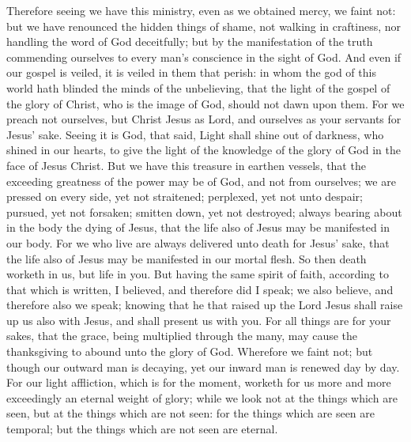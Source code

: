 Therefore seeing we have this ministry, even as we obtained mercy, we faint not: but we have renounced the hidden things of shame, not walking in craftiness, nor handling the word of God deceitfully; but by the manifestation of the truth commending ourselves to every man’s conscience in the sight of God. And even if our gospel is veiled, it is veiled in them that perish: in whom the god of this world hath blinded the minds of the unbelieving, that the light of the gospel of the glory of Christ, who is the image of God, should not dawn upon them. For we preach not ourselves, but Christ Jesus as Lord, and ourselves as your servants for Jesus’ sake. Seeing it is God, that said, Light shall shine out of darkness, who shined in our hearts, to give the light of the knowledge of the glory of God in the face of Jesus Christ.  But we have this treasure in earthen vessels, that the exceeding greatness of the power may be of God, and not from ourselves; we are pressed on every side, yet not straitened; perplexed, yet not unto despair; pursued, yet not forsaken; smitten down, yet not destroyed; always bearing about in the body the dying of Jesus, that the life also of Jesus may be manifested in our body. For we who live are always delivered unto death for Jesus’ sake, that the life also of Jesus may be manifested in our mortal flesh. So then death worketh in us, but life in you. But having the same spirit of faith, according to that which is written, I believed, and therefore did I speak; we also believe, and therefore also we speak; knowing that he that raised up the Lord Jesus shall raise up us also with Jesus, and shall present us with you. For all things are for your sakes, that the grace, being multiplied through the many, may cause the thanksgiving to abound unto the glory of God.  Wherefore we faint not; but though our outward man is decaying, yet our inward man is renewed day by day. For our light affliction, which is for the moment, worketh for us more and more exceedingly an eternal weight of glory; while we look not at the things which are seen, but at the things which are not seen: for the things which are seen are temporal; but the things which are not seen are eternal. 

